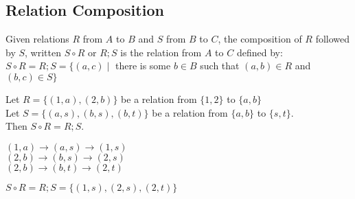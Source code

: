 \documentclass[../notes.tex]{subfiles}
\begin{document}
			\subsection{Relation Composition}
				Given relations $R$ from $A$ to $B$ and $S$ from $B$ to $C$, the composition of $R$ followed by $S$, written $S \circ R$ or $R;S$ is the relation from $A$ to $C$ defined by:\\
				$S \circ R = R;S = \bigl\{(a, c) \mid$ there is some $b \in B$ such that $(a, b) \in R$ and $(b, c) \in S\bigr\}$
				\begin{example}
					Let $R = \bigl\{(1, a), (2, b)\bigr\}$ be a relation from $\{1, 2\}$ to $\{a, b\}$\\
					Let $S = \bigl\{(a, s), (b, s), (b, t)\bigr\}$ be a relation from $\{a, b\}$ to $\{s, t\}$.\\
					Then $S \circ R = R;S$.
					\begin{indentparagraph}
						$(1, a) \rightarrow (a, s) \rightarrow (1, s)$\\
						$(2, b) \rightarrow (b, s) \rightarrow (2, s)$\\
						$(2, b) \rightarrow (b, t) \rightarrow (2, t)$
					\end{indentparagraph}
					$S \circ R = R;S = \bigl\{(1, s), (2, s), (2, t)\bigr\}$
				\end{example}
				\pagebreak
\end{document}
